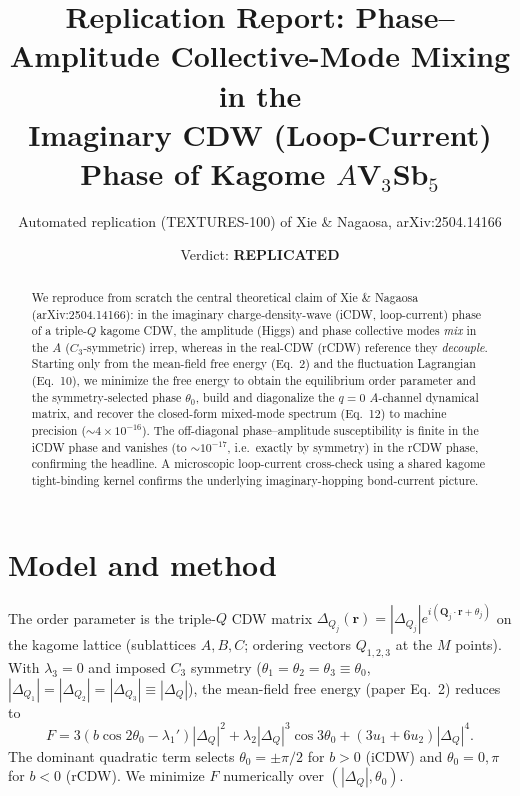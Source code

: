 \documentclass[11pt]{article}
\title{Replication Report: Phase--Amplitude Collective-Mode Mixing in the\\ Imaginary CDW (Loop-Current) Phase of Kagome $A$V$_3$Sb$_5$}
\author{Automated replication (TEXTURES-100) of Xie \& Nagaosa, arXiv:2504.14166}
\date{Verdict: \textbf{REPLICATED}}
\begin{document}
\maketitle

\begin{abstract}
We reproduce from scratch the central theoretical claim of Xie \& Nagaosa
(arXiv:2504.14166): in the imaginary charge-density-wave (iCDW, loop-current)
phase of a triple-$Q$ kagome CDW, the amplitude (Higgs) and phase collective
modes \emph{mix} in the $A$ ($C_3$-symmetric) irrep, whereas in the real-CDW
(rCDW) reference they \emph{decouple}. Starting only from the mean-field free
energy (Eq.~2) and the fluctuation Lagrangian (Eq.~10), we minimize the free
energy to obtain the equilibrium order parameter and the symmetry-selected phase
$\theta_0$, build and diagonalize the $q=0$ $A$-channel dynamical matrix, and
recover the closed-form mixed-mode spectrum (Eq.~12) to machine precision
($\sim\!4\times10^{-16}$). The off-diagonal phase--amplitude susceptibility is
finite in the iCDW phase and vanishes (to $\sim\!10^{-17}$, i.e.\ exactly by
symmetry) in the rCDW phase, confirming the headline. A microscopic loop-current
cross-check using a shared kagome tight-binding kernel confirms the underlying
imaginary-hopping bond-current picture.
\end{abstract}

\section{Model and method}
The order parameter is the triple-$Q$ CDW matrix
$\Delta_{Q_j}(\mathbf r)=|\Delta_{Q_j}|e^{i(\mathbf Q_j\cdot\mathbf r+\theta_j)}$
on the kagome lattice (sublattices $A,B,C$; ordering vectors $Q_{1,2,3}$ at the
$M$ points). With $\lambda_3=0$ and imposed $C_3$ symmetry
($\theta_1=\theta_2=\theta_3\equiv\theta_0$, $|\Delta_{Q_1}|=|\Delta_{Q_2}|=|\Delta_{Q_3}|\equiv|\Delta_Q|$),
the mean-field free energy (paper Eq.~2) reduces to
\begin{equation}
F = 3(b\cos2\theta_0-\lambda_1')|\Delta_Q|^2 + \lambda_2|\Delta_Q|^3\cos3\theta_0
    + (3u_1+6u_2)|\Delta_Q|^4 .
\end{equation}
The dominant quadratic term selects $\theta_0=\pm\pi/2$ for $b>0$ (iCDW) and
$\theta_0=0,\pi$ for $b<0$ (rCDW). We minimize $F$ numerically over
$(|\Delta_Q|,\theta_0)$.
\end{document}
